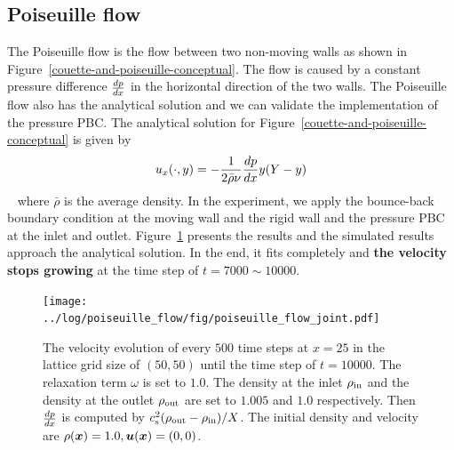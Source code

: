 \subsection{Poiseuille flow}
The Poiseuille flow is the flow between two non-moving walls as shown in Figure~\ref{couette-and-poiseuille-conceptual}.
The flow is caused by a constant pressure difference $\frac{d p}{d x}$
in the horizontal direction of the two walls.
The Poiseuille flow also has the analytical solution
and we can validate the implementation of the pressure PBC.
The analytical solution for Figure~\ref{couette-and-poiseuille-conceptual} is given by
\begin{equation*}
\begin{aligned}
  u_x(\cdot, y) = - \frac{1}{2\bar{\rho} \nu} \frac{d p}{d x} y (Y - y)
\end{aligned}
\end{equation*}
~\cite{mendiburu2009analytical}
where $\bar{\rho}$ is the average density.
In the experiment, we apply the bounce-back boundary condition
at the moving wall and the rigid wall
and the pressure PBC at the inlet and outlet.
Figure~\ref{fig:poiseuille-velocity-evolution} presents the results
and the simulated results approach the analytical solution.
In the end, it fits completely
and {\bf the velocity stops growing} at the time step of $t = 7000 \sim 10000$.

\begin{figure}[H]
  \vspace{-3mm}
  \centering
  \texttt{[image: ../log/poiseuille\_flow/fig/poiseuille\_flow\_joint.pdf]}
  \vspace{-3mm}
  \caption{The velocity evolution of every $500$ time steps at
  $x = 25$ in the lattice grid size of $(50, 50)$ until the time step of $t = 10000$.
  The relaxation term $\omega$ is set to $1.0$.
  The density at the inlet $\rho_{\rm in}$ and the density
  at the outlet $\rho_{\rm out}$ are set to $1.005$ and $1.0$ respectively.
  Then $\frac{d p}{d x}$ is computed by $c_{\rm s}^2(\rho_{\rm out} - \rho_{\rm in}) / X$.
  The initial density and velocity are $\rho(\boldsymbol{x}) = 1.0, \boldsymbol{u}(\boldsymbol{x}) = (0, 0)$.
  \label{fig:poiseuille-velocity-evolution}}
\end{figure}

